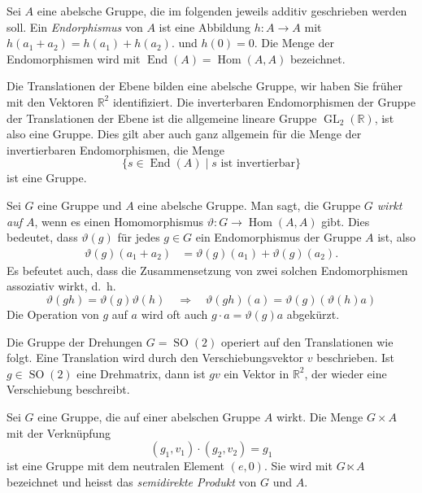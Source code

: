 \begin{definition}
Sei $A$ eine abelsche Gruppe, die im folgenden jeweils additiv geschrieben
werden soll.
Ein {\em Endorphismus} von $A$ ist eine Abbildung $h\colon A\to A$ mit
$h(a_1+a_2)=h(a_1)+h(a_2)$.
und
$h(0)=0$.
Die Menge der Endomorphismen wird mit
$\operatorname{End}(A)=\operatorname{Hom}(A,A)$ bezeichnet.
\end{definition}

Die Translationen der Ebene bilden eine abelsche Gruppe, wir haben
Sie früher mit den Vektoren $\mathbb{R}^2$ identifiziert.
Die inverterbaren Endomorphismen der Gruppe der Translationen der
Ebene ist die allgemeine lineare Gruppe $\operatorname{GL}_2(\mathbb{R})$,
ist also eine Gruppe.
Dies gilt aber auch ganz allgemein für die Menge der invertierbaren
Endomorphismen, die Menge
\[
\{ s \in \operatorname{End}(A)
\mid
\text{$s$ ist invertierbar}
\}
\]
ist eine Gruppe.

\begin{definition}
Sei $G$ eine Gruppe und $A$ eine abelsche Gruppe.
Man sagt, die Gruppe {\em $G$ wirkt auf $A$}, wenn
es einen Homomorphismus $\vartheta\colon G\to\operatorname{Hom}(A,A)$ gibt.
Dies bedeutet, dass $\vartheta(g)$ für jedes $g\in G$ ein Endomorphismus
der Gruppe $A$ ist, also
\begin{align*}
\vartheta(g)(a_1+a_2)&=\vartheta(g)(a_1) + \vartheta(g)(a_2).
\end{align*}
Es befeutet auch, dass die Zusammensetzung von zwei solchen
Endomorphismen assoziativ wirkt, d.~h.
\[
\vartheta(gh)=\vartheta(g)\vartheta(h)
\quad\Rightarrow\quad
\vartheta(gh)(a) = \vartheta(g)(\vartheta(h)a)
\]
Die Operation von $g$ auf $a$ wird oft auch $g\cdot a = \vartheta(g)a$
abgekürzt.
\end{definition}

Die Gruppe der Drehungen $G=\operatorname{SO}(2)$ operiert auf den
Translationen wie folgt.
Eine Translation wird durch den Verschiebungsvektor $v$ beschrieben.
Ist $g\in\operatorname{SO}(2)$ eine Drehmatrix, dann ist $gv$ ein
Vektor in $\mathbb{R}^2$, der wieder eine Verschiebung beschreibt.

\begin{satz}
Sei $G$ eine Gruppe, die auf einer abelschen Gruppe $A$ wirkt.
Die Menge $G\times A$ mit der Verknüpfung
\[
(g_1,v_1)\cdot(g_2,v_2)
=
g_1
\]
ist eine Gruppe mit dem neutralen Element $(e,0)$.
Sie wird mit $G\ltimes A$ bezeichnet und heisst das {\em semidirekte Produkt}
von $G$ und $A$.
\end{satz}

